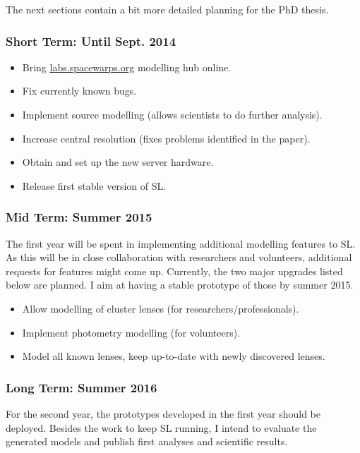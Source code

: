 \documentclass[11pt]{article}
\begin{document}
The next sections contain a bit more detailed planning for the PhD thesis.

\subsubsection{Short Term: Until Sept. 2014} \label{sec:plan_short}

\begin{itemize}
  \item Bring \url{labs.spacewarps.org} modelling hub online.
  \item Fix currently known bugs.
  \item Implement source modelling (allows scientists to do further analysis).
  \item Increase central resolution (fixes problems identified in the paper).
  \item Obtain and set up the new server hardware.
  \item Release first stable version of SL.
\end{itemize}


\subsubsection{Mid Term: Summer 2015}

The first year will be spent in implementing additional modelling features to SL.
As this will be in close collaboration with researchers and volunteers, additional requests for features might come up.
Currently, the two major upgrades listed below are planned. I aim at having a stable prototype of those by summer 2015.

\begin{itemize}
  \item Allow modelling of cluster lenses (for researchers/professionals).
  \item Implement photometry modelling (for volunteers).
  \item Model all known lenses, keep up-to-date with newly discovered lenses.
\end{itemize}


\subsubsection{Long Term: Summer 2016}

For the second year, the prototypes developed in the first year should be deployed.
Besides the work to keep SL running, I intend to evaluate the generated models and publish first analyses and scientific results.
\end{document}
